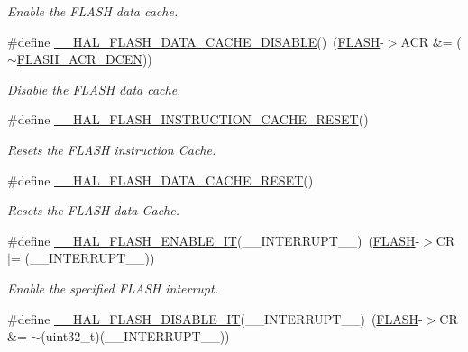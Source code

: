 \begin{DoxyCompactItemize}
\begin{DoxyCompactList}\small\item\em Enable the F\+L\+A\+SH data cache. \end{DoxyCompactList}\item 
\#define \hyperlink{group___f_l_a_s_h___exported___macros_ga247f85a1fcc780be21f9fc2f1d29ee7e}{\+\_\+\+\_\+\+H\+A\+L\+\_\+\+F\+L\+A\+S\+H\+\_\+\+D\+A\+T\+A\+\_\+\+C\+A\+C\+H\+E\+\_\+\+D\+I\+S\+A\+B\+LE}()~(\hyperlink{group___peripheral__declaration_ga844ea28ba1e0a5a0e497f16b61ea306b}{F\+L\+A\+SH}-\/$>$A\+CR \&= ($\sim$\hyperlink{group___peripheral___registers___bits___definition_ga5a9a5cc3aa05dc62264addab1008c896}{F\+L\+A\+S\+H\+\_\+\+A\+C\+R\+\_\+\+D\+C\+EN}))
\begin{DoxyCompactList}\small\item\em Disable the F\+L\+A\+SH data cache. \end{DoxyCompactList}\item 
\#define \hyperlink{group___f_l_a_s_h___exported___macros_ga69dff538775ee23738d54eef4a259b66}{\+\_\+\+\_\+\+H\+A\+L\+\_\+\+F\+L\+A\+S\+H\+\_\+\+I\+N\+S\+T\+R\+U\+C\+T\+I\+O\+N\+\_\+\+C\+A\+C\+H\+E\+\_\+\+R\+E\+S\+ET}()
\begin{DoxyCompactList}\small\item\em Resets the F\+L\+A\+SH instruction Cache. \end{DoxyCompactList}\item 
\#define \hyperlink{group___f_l_a_s_h___exported___macros_ga3b94f4f103ddab361802c8defd3a9c34}{\+\_\+\+\_\+\+H\+A\+L\+\_\+\+F\+L\+A\+S\+H\+\_\+\+D\+A\+T\+A\+\_\+\+C\+A\+C\+H\+E\+\_\+\+R\+E\+S\+ET}()
\begin{DoxyCompactList}\small\item\em Resets the F\+L\+A\+SH data Cache. \end{DoxyCompactList}\item 
\#define \hyperlink{group___f_l_a_s_h___exported___macros_ga13fa137a911f02a2f94fb9fb0762a340}{\+\_\+\+\_\+\+H\+A\+L\+\_\+\+F\+L\+A\+S\+H\+\_\+\+E\+N\+A\+B\+L\+E\+\_\+\+IT}(\+\_\+\+\_\+\+I\+N\+T\+E\+R\+R\+U\+P\+T\+\_\+\+\_\+)~(\hyperlink{group___peripheral__declaration_ga844ea28ba1e0a5a0e497f16b61ea306b}{F\+L\+A\+SH}-\/$>$CR $\vert$= (\+\_\+\+\_\+\+I\+N\+T\+E\+R\+R\+U\+P\+T\+\_\+\+\_\+))
\begin{DoxyCompactList}\small\item\em Enable the specified F\+L\+A\+SH interrupt. \end{DoxyCompactList}\item 
\#define \hyperlink{group___f_l_a_s_h___exported___macros_ga1f40f507b5d4b3a4da68e4244a1097ee}{\+\_\+\+\_\+\+H\+A\+L\+\_\+\+F\+L\+A\+S\+H\+\_\+\+D\+I\+S\+A\+B\+L\+E\+\_\+\+IT}(\+\_\+\+\_\+\+I\+N\+T\+E\+R\+R\+U\+P\+T\+\_\+\+\_\+)~(\hyperlink{group___peripheral__declaration_ga844ea28ba1e0a5a0e497f16b61ea306b}{F\+L\+A\+SH}-\/$>$CR \&= $\sim$(uint32\+\_\+t)(\+\_\+\+\_\+\+I\+N\+T\+E\+R\+R\+U\+P\+T\+\_\+\+\_\+))

\end{DoxyCompactItemize}
